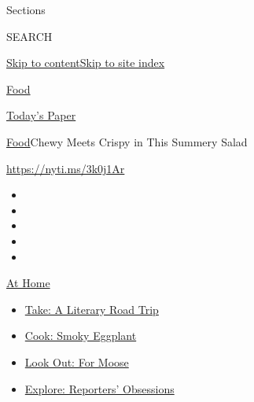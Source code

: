 Sections

SEARCH

\protect\hyperlink{site-content}{Skip to
content}\protect\hyperlink{site-index}{Skip to site index}

\href{https://www.nytimes3xbfgragh.onion/section/food}{Food}

\href{https://myaccount.nytimes3xbfgragh.onion/auth/login?response_type=cookie\&client_id=vi}{}

\href{https://www.nytimes3xbfgragh.onion/section/todayspaper}{Today's
Paper}

\href{/section/food}{Food}\textbar{}Chewy Meets Crispy in This Summery
Salad

\url{https://nyti.ms/3k0j1Ar}

\begin{itemize}
\item
\item
\item
\item
\item
\end{itemize}

\href{https://www.nytimes3xbfgragh.onion/spotlight/at-home?action=click\&pgtype=Article\&state=default\&region=TOP_BANNER\&context=at_home_menu}{At
Home}

\begin{itemize}
\tightlist
\item
  \href{https://www.nytimes3xbfgragh.onion/2020/07/28/books/time-for-a-literary-road-trip.html?action=click\&pgtype=Article\&state=default\&region=TOP_BANNER\&context=at_home_menu}{Take:
  A Literary Road Trip}
\item
  \href{https://www.nytimes3xbfgragh.onion/2020/07/29/magazine/bored-with-your-home-cooking-some-smoky-eggplant-will-fix-that.html?action=click\&pgtype=Article\&state=default\&region=TOP_BANNER\&context=at_home_menu}{Cook:
  Smoky Eggplant}
\item
  \href{https://www.nytimes3xbfgragh.onion/2020/07/27/travel/moose-michigan-isle-royale.html?action=click\&pgtype=Article\&state=default\&region=TOP_BANNER\&context=at_home_menu}{Look
  Out: For Moose}
\item
  \href{https://www.nytimes3xbfgragh.onion/interactive/2020/at-home/even-more-reporters-editors-diaries-lists-recommendations.html?action=click\&pgtype=Article\&state=default\&region=TOP_BANNER\&context=at_home_menu}{Explore:
  Reporters' Obsessions}
\end{itemize}

